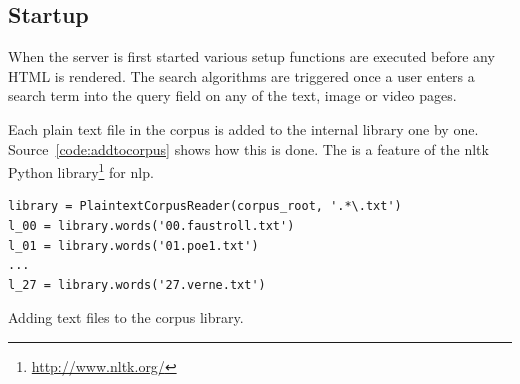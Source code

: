 

\subsection{Startup}

When the server is first started various setup functions are executed before any HTML is rendered. The search algorithms are triggered once a user enters a search term into the query field on any of the text, image or video pages.

Each plain text file in the corpus is added to the internal library one by one. Source~\ref{code:addtocorpus} shows how this is done. The  is a feature of the \gls{nltk} Python library\footnote{\url{http://www.nltk.org/}} for \acrlong{nlp}.

\begin{listing}
  \begin{verbatim}
library = PlaintextCorpusReader(corpus_root, '.*\.txt')
l_00 = library.words('00.faustroll.txt')
l_01 = library.words('01.poe1.txt')
...
l_27 = library.words('27.verne.txt')
  \end{verbatim}
\caption{Adding text files to the corpus library.}
\label{code:addtocorpus}
\end{listing}

